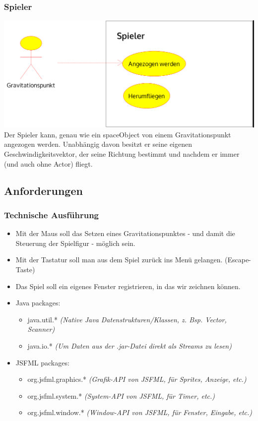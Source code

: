 \documentclass[12pt,a4paper]{scrartcl}
\begin{document}
\subsubsection{Spieler}
\includegraphics[scale=0.2]{use_cases/spieler.png}\\
Der Spieler kann, genau wie ein spaceObject von einem Gravitationspunkt angezogen werden. Unabhängig davon besitzt er seine eigenen
Geschwindigkeitsvektor, der seine Richtung bestimmt und nachdem er immer (und auch ohne Actor) fliegt.


\subsection{Anforderungen} 
\subsubsection{Technische Ausführung}
\begin{itemize}
\item Mit der Maus soll das Setzen eines Gravitationspunktes - und damit die Steuerung der Spielfigur - möglich sein.
\item Mit der Tastatur soll man aus dem Spiel zurück ins Menü gelangen. (Escape-Taste)
\item Das Spiel soll ein eigenes Fenster registrieren, in das wir zeichnen können. 
\item Java packages: \begin{itemize}
	\item java.util.* \textit{(Native Java Datenstrukturen/Klassen, z. Bsp. Vector, Scanner)}
	\item java.io.* \textit{(Um Daten aus der .jar-Datei direkt als Streams zu lesen)}
\end{itemize}
\item JSFML packages: \begin{itemize}
	\item org.jsfml.graphics.* \textit{(Grafik-API von JSFML, für Sprites, Anzeige, etc.)}
	\item org.jsfml.system.* \textit{(System-API von JSFML, für Timer, etc.)}
	\item org.jsfml.window.* \textit{(Window-API von JSFML, für Fenster, Eingabe, etc.)}
\end{itemize}
\end{itemize}
\end{document}
